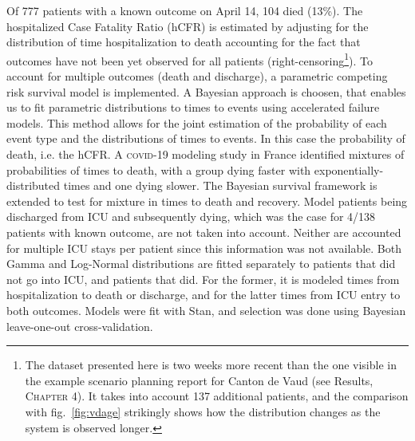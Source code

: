 Of 777 patients with a known outcome on April 14, 104 died (13\%). The hospitalized Case Fatality Ratio (hCFR) is estimated by adjusting for the distribution of time hospitalization to death accounting for the fact that outcomes have not been yet observed for all patients (right-censoring\footnote[][-2\baselineskip]{The dataset presented here is two weeks more recent than the one visible in the example scenario planning report for Canton de Vaud (see Results, \textsc{Chapter 4}). It takes into account 137 additional patients, and the comparison with fig.~\ref{fig:vdage} strikingly shows how the distribution changes as the system is observed longer.}). To account for multiple outcomes (death and discharge), a parametric competing risk survival model is implemented\cite{Ghani:MethodsEstimatingCase:2005}. A Bayesian approach is choosen\cite{Bellot:TreebasedBayesianMixture:2018}, that enables us to fit parametric distributions to times to events using accelerated failure models. This method allows for the joint estimation of the probability of each event type and the distributions of times to events. In this case the probability of death, i.e. the hCFR. A \textsc{covid}-19 modeling study in France identified mixtures of probabilities of times to death, with a group dying faster with exponentially-distributed times and one dying slower\cite{Salje:EstimatingBurdenSARSCoV2:2020}. The Bayesian survival framework is extended to test for mixture in times to death and recovery. Model patients being discharged from ICU and subsequently dying, which was the case for 4/138 patients with known outcome, are not taken into account. Neither are accounted for multiple ICU stays per patient since this information was not available. Both Gamma and Log-Normal distributions are fitted separately to patients that did not go into ICU, and patients that did. For the former, it is modeled times from hospitalization to death or discharge, and for the latter times from ICU entry to both outcomes. Models were fit with Stan\cite[-5\baselineskip]{Carpenter:StanProbabilisticProgramming:2017}, and selection was done using Bayesian leave-one-out cross-validation\cite[-2.5\baselineskip]{Vehtari:PracticalBayesianModel:2017}. \\
